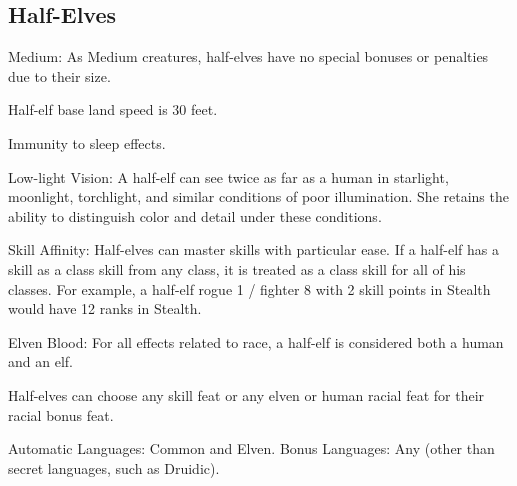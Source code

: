 \subsection{Half-Elves}
\begin{itemize*}
\item Medium: As Medium creatures, half-elves have no special bonuses or penalties due to their size.
\item Half-elf base land speed is 30 feet.
\item Immunity to sleep effects.
\item Low-light Vision: A half-elf can see twice as far as a human in starlight, moonlight, torchlight, and similar conditions of poor illumination. She retains the ability to distinguish color and detail under these conditions.
 \item Skill Affinity: Half-elves can master skills with particular ease. If a half-elf has a skill as a class skill from any class, it is treated as a class skill for all of his classes. For example, a half-elf rogue 1 / fighter 8 with 2 skill points in Stealth would have 12 ranks in Stealth.
\item Elven Blood: For all effects related to race, a half-elf is considered both a human and an elf.
\item Half-elves can choose any skill feat or any elven or human racial feat for their racial bonus feat.
\item Automatic Languages: Common and Elven. Bonus Languages: Any (other than secret languages, such as Druidic).
\end{itemize*}

